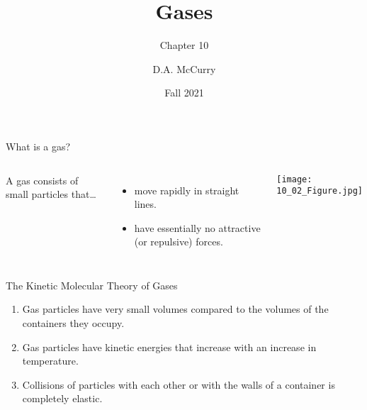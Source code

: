 \documentclass[handout]{beamer}
\title{Gases}
\subtitle{Chapter 10}
\institute[CHEM115 Bloomsburg University]{CHEM115 --- Chemistry for the Sciences I \\ Bloomsburg University}
\author{D.A. McCurry}
\date{Fall 2021}
\begin{document}
\maketitle
{}


\begin{frame}{What is a gas?}
	\begin{columns}
		A gas consists of small particles that\ldots
		\begin{itemize}
			\item move rapidly in straight lines.
			\item have essentially no attractive (or repulsive) forces.
		\end{itemize}
		\begin{center}
			\texttt{[image: 10\_02\_Figure.jpg]}
		\end{center}
	\end{columns}

	\begin{block}{The Kinetic Molecular Theory of Gases}
		\begin{enumerate}
			\item Gas particles have very small volumes compared to
				the volumes of the containers they occupy.
			\item Gas particles have \alert{kinetic energies} that
				increase with an increase in temperature.
			\item Collisions of particles with each other or with
				the walls of a container is completely
				\alert{elastic}.
		\end{enumerate}
	\end{block}
\end{frame}
\end{document}
